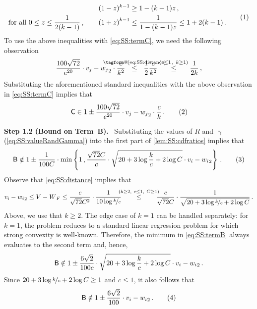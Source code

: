 \documentclass[11pt,letterpaper]{article}
\makeatletter
\theoremstyle{plain}
\theoremstyle{definition}
\theoremstyle{remark}
\newcommand{\yesnum}{\addtocounter{equation}{1}\tag{\theequation}}
\renewcommand{\eqref}[1]{\textup{\eqrefform@{\ref{#1}}}}
\let\eqrefform@\tagform@
\newcommand{\Stackrel}[2]{\stackrel{\mathmakebox[\widthof{\ensuremath{#2}}]{#1}}{#2}}
\newcommand{\inbrace}[1]{\ensuremath{\left\{#1\right\}}}
\newcommand{\inparen}[1]{\ensuremath{\left(#1\right)}}
\let\norm\relax
\newcommand{\norm}[1]{\ensuremath{\left\lVert #1 \right\rVert}}
\newcommand{\nfrac}[2]{\nicefrac{#1}{#2}}
\renewcommand{\paragraph}[1]{\medskip \noindent\textbf{#1}~}
\renewcommand{\gamma}{\upgamma}
\makeatother
\begin{document}
{{\begin{align*}
\begin{split}
                (1-z)^{k-1} &\geq 1-(k-1)z\,,\\
            \text{for all $0\leq z\leq \frac{1}{2(k-1)}$\,,}\qquad 
                \inparen{1+z}^{k-1} &\leq \frac{1}{1-(k-1)z}\leq 1+2(k-1)\,.
        \end{split}
        \yesnum\label{eq:bernouliiInequality}
    \end{align*}
    To use the above inequalities with \cref{eq:SS:termC}, we need the following observation 
    \[
        \frac{100\sqrt{72}}{e^{20}} 
                \cdot 
                \norm{v_j-w_j}_2
                \cdot \frac{c}{k^{2}}
        ~~\Stackrel{\rm\eqref{eq:SS:distance}}{\leq}~~ \frac{1}{2}\frac{c}{k^{2}}
        ~~\quad\Stackrel{(c\leq 1\,,~k\geq 1)}{\leq}\quad~~ \frac{1}{2k}\,,
    \]
    Substituting the aforementioned standard inequalities with the above observation in \cref{eq:SS:termC} implies that 
    \[
        \textsf{C} 
            \in 1 \pm \frac{100\sqrt{72}}{e^{20}} 
                \cdot 
                \norm{v_j-w_j}_2
                \cdot {\frac{c}{k}}\,.
\yesnum\label{eq:SS:termC:final}
    \] 
    
    \paragraph{Step 1.2 (Bound on Term~\textsf{B}).}
    Substituting the values of $R$ and $\gamma$ (\cref{eq:SS:valueRandGamma}) into the first part of \cref{lem:SS:cdfratios} implies that
    \[
        \textsf{B} \notin 1 \pm \frac{1}{100C}\cdot 
                \min\inbrace{
                    1\,,
                    \frac{\sqrt{72}C}{c}\cdot \sqrt{
                        20 + 3\log{\frac{k}{c}}
                        + 2\log{C}
                    }\cdot \norm{v_i-w_i}_2 
                }\,.
            \yesnum\label{eq:SS:termB}
    \]
    Observe that \cref{eq:SS:distance} implies that 
    \[
        \norm{v_i-w_i}_2\leq \norm{V-W}_F\leq \frac{c}{\sqrt{72}C^2}\cdot \frac{1}{10\log{\nfrac{k}{c}}}
        ~~~\quad\Stackrel{(k\geq 2,~ c\leq 1,~ C\geq 1)}{\leq}\quad~~~
        \frac{c}{\sqrt{72}C}\cdot 
        \frac{1}{
            \sqrt{20+3\log{\nfrac{k}{c}}+2\log{C}}
        }\,.
    \]
    Above, we use that $k\geq 2$.
    The edge case of $k=1$ can be handled separately: for $k=1$, the problem reduces to a standard linear regression problem for which strong convexity is well-known.
    Therefore, the minimum in \cref{eq:SS:termB} always evaluates to the second term and, hence,  
    \[
        \textsf{B}\notin 1\pm \frac{6\sqrt{2}}{100c} \cdot \sqrt{20+3\log{\frac{k}{c}}+2\log{C}}\cdot \norm{v_i-w_i}_2\,.
    \]
    Since $20+3\log{\nfrac{k}{c}}+2\log{C}\geq 1$ and $c\leq 1$, it also follows that 
    \[
        \textsf{B}\notin 1\pm \frac{6\sqrt{2}}{100} \cdot \norm{v_i-w_i}_2\,.
        \yesnum\label{eq:SS:termB:final}
    \]
    
}}
\end{document}
